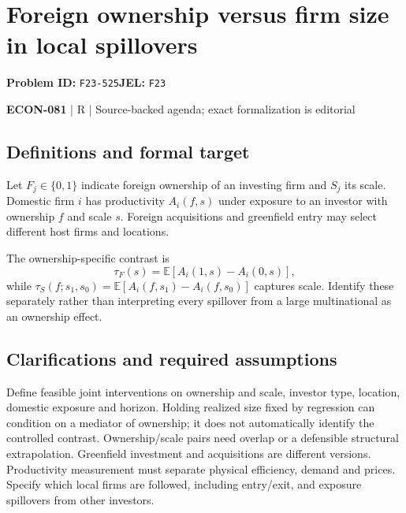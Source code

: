 \documentclass[11pt,a4paper]{article}
\begin{document}
\section*{Foreign ownership versus firm size in local spillovers}
\textbf{Problem ID:} \texttt{F23-525}\quad \textbf{JEL:} \texttt{F23}\par
\label{problem:OP-0644}


\label{audited:ECON-081}

{\sffamily\small\color{muted}\textbf{ECON-081} | R | Source-backed agenda; exact formalization is editorial\par}

\subsection*{Definitions and formal target}

Let $F_j\in\{0,1\}$ indicate foreign ownership of an investing firm and $S_j$ its scale. Domestic firm $i$ has productivity $A_i(f,s)$ under exposure to an investor with ownership $f$ and scale $s$. Foreign acquisitions and greenfield entry may select different host firms and locations.

The ownership-specific contrast is
\[
 \tau_F(s)=\mathbb E[A_i(1,s)-A_i(0,s)],
\]
while $\tau_S(f;s_1,s_0)=\mathbb E[A_i(f,s_1)-A_i(f,s_0)]$ captures scale. Identify these separately rather than interpreting every spillover from a large multinational as an ownership effect.

\subsection*{Clarifications and required assumptions}

Define feasible joint interventions on ownership and scale, investor type, location, domestic exposure and horizon. Holding realized size fixed by regression can condition on a mediator of ownership; it does not automatically identify the controlled contrast. Ownership/scale pairs need overlap or a defensible structural extrapolation. Greenfield investment and acquisitions are different versions. Productivity measurement must separate physical efficiency, demand and prices. Specify which local firms are followed, including entry/exit, and exposure spillovers from other investors.
\end{document}
